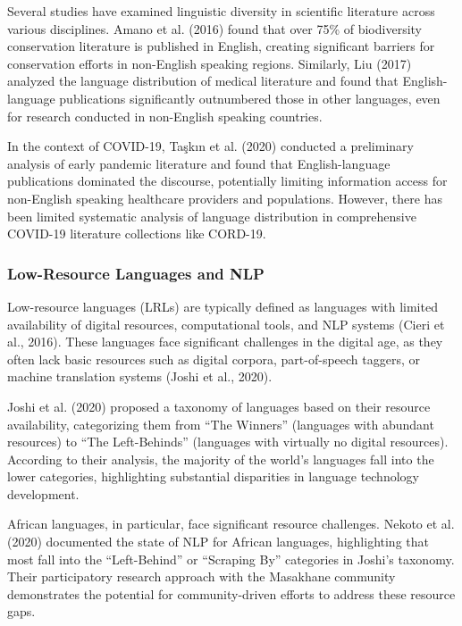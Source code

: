 \documentclass[
]{article}
\begin{document}
Several studies have examined linguistic diversity in scientific
literature across various disciplines. Amano et al. (2016) found that
over 75\% of biodiversity conservation literature is published in
English, creating significant barriers for conservation efforts in
non-English speaking regions. Similarly, Liu (2017) analyzed the
language distribution of medical literature and found that
English-language publications significantly outnumbered those in other
languages, even for research conducted in non-English speaking
countries.

In the context of COVID-19, Taşkın et al. (2020) conducted a preliminary
analysis of early pandemic literature and found that English-language
publications dominated the discourse, potentially limiting information
access for non-English speaking healthcare providers and populations.
However, there has been limited systematic analysis of language
distribution in comprehensive COVID-19 literature collections like
CORD-19.

\subsubsection{Low-Resource Languages and
NLP}\label{low-resource-languages-and-nlp}

Low-resource languages (LRLs) are typically defined as languages with
limited availability of digital resources, computational tools, and NLP
systems (Cieri et al., 2016). These languages face significant
challenges in the digital age, as they often lack basic resources such
as digital corpora, part-of-speech taggers, or machine translation
systems (Joshi et al., 2020).

Joshi et al. (2020) proposed a taxonomy of languages based on their
resource availability, categorizing them from ``The Winners'' (languages
with abundant resources) to ``The Left-Behinds'' (languages with
virtually no digital resources). According to their analysis, the
majority of the world's languages fall into the lower categories,
highlighting substantial disparities in language technology development.

African languages, in particular, face significant resource challenges.
Nekoto et al. (2020) documented the state of NLP for African languages,
highlighting that most fall into the ``Left-Behind'' or ``Scraping By''
categories in Joshi's taxonomy. Their participatory research approach
with the Masakhane community demonstrates the potential for
community-driven efforts to address these resource gaps.
\end{document}
